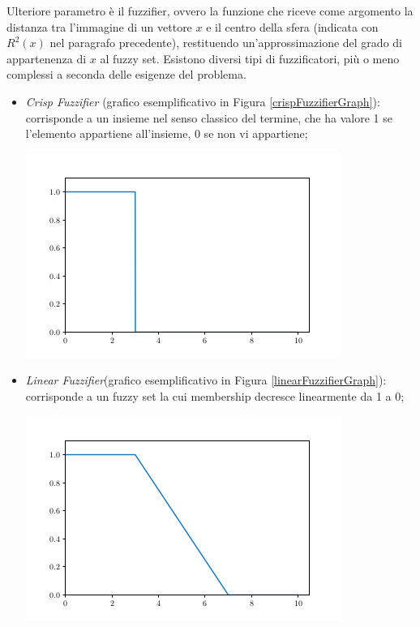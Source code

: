 \documentclass[12pt,a4paper]{report}
\begin{document}
Ulteriore parametro è il fuzzifier, ovvero la funzione che riceve come argomento la distanza tra l'immagine di un vettore $x$ e il centro della sfera (indicata con $R^2(x)$ nel paragrafo precedente), restituendo un'approssimazione del grado di appartenenza di $x$ al fuzzy set. Esistono diversi tipi di fuzzificatori, più o meno complessi a seconda delle esigenze del problema.
\begin{itemize}
\item \emph{Crisp Fuzzifier} (grafico esemplificativo in Figura \ref{crispFuzzifierGraph}): corrisponde a un insieme nel senso classico del termine, che ha valore 1 se l'elemento appartiene all'insieme, 0 se non vi appartiene;

\begin{minipage}{\linewidth}
	\centering
      \includegraphics[width=0.8\linewidth]{images/crispFuzzifier.png}
	\label{crispFuzzifierGraph}
\end{minipage}

\item \emph{Linear Fuzzifier}(grafico esemplificativo in Figura \ref{linearFuzzifierGraph}): corrisponde a un fuzzy set la cui membership decresce linearmente da 1 a 0;


\begin{minipage}{\linewidth}
	\centering
      \includegraphics[width=0.8\linewidth]{images/linearFuzzifier.png}
	\label{linearFuzzifierGraph}
\end{minipage}


\end{itemize}
\end{document}
